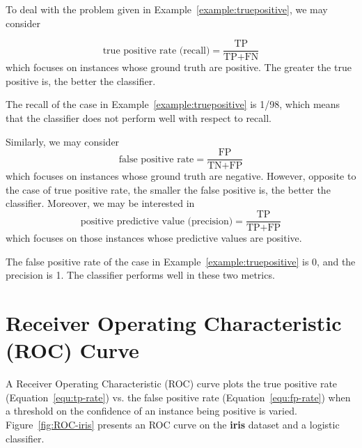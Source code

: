 To deal with the problem given in Example~\ref{example:truepositive}, we may consider 

\begin{equation}\label{equ:tp-rate}
    \text{true positive rate (recall)} =  \frac{\text{TP}}{\text{TP}+\text{FN}}
\end{equation}
which focuses on instances whose ground truth are positive. The greater the true positive is, the better the classifier. 

\begin{example}
The recall of the case in Example~\ref{example:truepositive} is 1/98, which means that the classifier does not perform well with respect to recall.
\end{example}

Similarly, we may consider 
\begin{equation}\label{equ:fp-rate}
    \text{false positive rate} =  \frac{\text{FP}}{\text{TN}+\text{FP}}
\end{equation}
which focuses on instances whose ground truth are negative. However, opposite to the case of true positive rate, the smaller the false positive is, the better the classifier. Moreover, we may be interested in  
\begin{equation}\label{equ:positivePrediction}
    \text{positive predictive value (precision)} =  \frac{\text{TP}}{\text{TP}+\text{FP}}
\end{equation}
which focuses on those instances whose predictive values are positive. 

\begin{example}
The false positive rate of the case in Example~\ref{example:truepositive} is 0, and the precision is 1. The classifier performs well in these two metrics. 
\end{example}

\section{Receiver Operating Characteristic (ROC) Curve}

A Receiver Operating Characteristic (ROC) curve plots the true positive rate (Equation~\ref{equ:tp-rate}) vs. the false positive rate (Equation~\ref{equ:fp-rate}) when a threshold on the confidence of an instance being positive is varied. Figure~\ref{fig:ROC-iris} presents an ROC curve on the \textbf{iris} dataset and a logistic classifier. 

